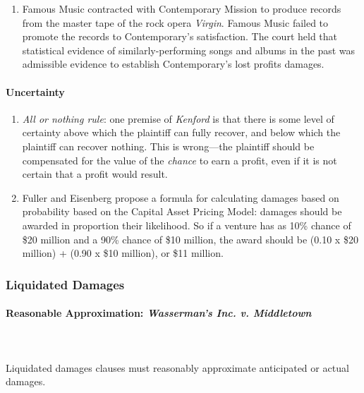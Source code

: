 \begin{enumerate}
    \item Famous Music contracted with Contemporary Mission to produce records 
    from the master tape of the rock opera \emph{Virgin}. Famous Music failed 
    to promote the records to Contemporary's satisfaction. The court held that 
    statistical evidence of similarly-performing songs and albums in the past 
    was admissible evidence to establish Contemporary's lost profits damages.
\end{enumerate}

\paragraph{Uncertainty}

\begin{enumerate}
    \item \emph{All or nothing rule}: one premise of \emph{Kenford} is that 
    there is some level of certainty above which the plaintiff can fully 
    recover, and below which the plaintiff can recover nothing. This is 
    wrong---the plaintiff should be compensated for the value of the 
    \emph{chance} to earn a profit, even if it is not certain that a profit 
    would result.
    \item Fuller and Eisenberg propose a formula for calculating damages based 
    on probability based on the Capital Asset Pricing Model: damages should be 
    awarded in proportion their likelihood.  So if a venture has as 10\% 
    chance of \$20 million and a 90\% chance of \$10 million, the award should 
    be (0.10 x \$20 million) + (0.90 x \$10 million), or \$11 million.
\end{enumerate}

\subsubsection{Liquidated Damages}

\paragraph{Reasonable Approximation: \emph{Wasserman's Inc. v. Middletown}}
~\\\\
Liquidated damages clauses must reasonably approximate anticipated or actual 
damages.

